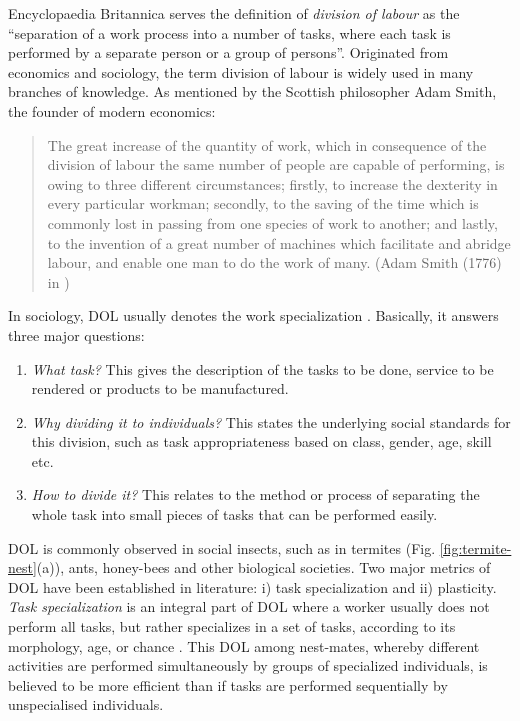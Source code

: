 Encyclopaedia Britannica  serves the definition of {\em division of labour} as the ``separation of a work process into a number of tasks, where each task is performed by a separate person or a group of persons''. Originated from economics and sociology, the term division of labour is widely used in many branches of knowledge. As mentioned by the Scottish philosopher Adam Smith, the founder of modern economics:
\begin{quote}
\ssp 
The great increase of the quantity of work, which in consequence of the division of labour the same number of people are capable of performing, is owing to three different circumstances; firstly, to increase the dexterity in every particular workman; secondly, to the saving of the time which is commonly lost in passing from one species of work to another; and lastly, to the invention of a great number of machines which facilitate and abridge labour, and enable one man to do the work of many.
(Adam Smith (1776) in )
\end{quote} 
\sdp
In sociology, DOL usually denotes the work specialization \cite{Sayer+1992}. Basically, it answers three major questions:
\begin{enumerate}
\item {\em What task?} This gives the description of the tasks to be done, service to be rendered or products to be manufactured.
\item {\em Why dividing it to individuals?} This states the underlying social standards for this division, such as task appropriateness based on class, gender, age, skill etc.
\item {\em How to divide it?} This relates to the method or process of separating the whole task into small pieces of tasks that can be performed easily. 
\end{enumerate}
DOL is commonly observed in social insects, such as in termites (Fig. \ref{fig:termite-nest}(a)), ants, honey-bees and other biological societies. Two major metrics of DOL have been established in literature: i) task specialization and ii) plasticity. {\em Task specialization} is an integral part of DOL where a worker usually does not perform all tasks, but rather specializes in a set of tasks, according to its morphology, age, or chance \cite{Bonabeau+1999}. This DOL among nest-mates, whereby different activities are performed simultaneously by groups of specialized individuals, is believed to be more efficient than if tasks are performed sequentially by unspecialised individuals.

